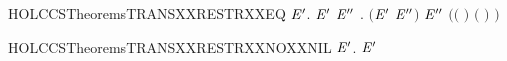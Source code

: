 \newcommand{\HOLCCSTheoremsTRANSXXRESTR}{\UseVerbatim{HOLCCSTheoremsTRANSXXRESTR}}
\begin{SaveVerbatim}{HOLCCSTheoremsTRANSXXRESTRXXEQ}
\HOLTokenTurnstile{} \HOLSymConst{\HOLTokenForall{}}   \ensuremath{\HOLBoundVar{E}\sp{\prime}}.
          \HOLTokenTransBegin{}\HOLTokenTransEnd \ensuremath{\HOLBoundVar{E}\sp{\prime}} \HOLSymConst{\HOLTokenEquiv{}}
       \HOLSymConst{\HOLTokenExists{}}\ensuremath{\HOLBoundVar{E}\sp{\prime\prime}} .
           \ensuremath{(}\ensuremath{\HOLBoundVar{E}\sp{\prime}} \HOLSymConst{\ensuremath{=}}   \ensuremath{\HOLBoundVar{E}\sp{\prime\prime}}\ensuremath{)} \HOLSymConst{\HOLTokenConj{}}  \HOLTokenTransBegin{}\HOLTokenTransEnd \ensuremath{\HOLBoundVar{E}\sp{\prime\prime}} \HOLSymConst{\HOLTokenConj{}}
           \ensuremath{(}\ensuremath{(} \HOLSymConst{\ensuremath{=}} \HOLConst{\ensuremath{\tau}}\ensuremath{)} \HOLSymConst{\HOLTokenDisj{}} \ensuremath{(} \HOLSymConst{\ensuremath{=}}  \ensuremath{)} \HOLSymConst{\HOLTokenConj{}}  \HOLConst{\HOLTokenNotIn{}}  \HOLSymConst{\HOLTokenConj{}}   \HOLConst{\HOLTokenNotIn{}} \ensuremath{)}
\end{SaveVerbatim}
\newcommand{\HOLCCSTheoremsTRANSXXRESTRXXEQ}{\UseVerbatim{HOLCCSTheoremsTRANSXXRESTRXXEQ}}
\begin{SaveVerbatim}{HOLCCSTheoremsTRANSXXRESTRXXNOXXNIL}
\HOLTokenTurnstile{} \HOLSymConst{\HOLTokenForall{}}   \ensuremath{\HOLBoundVar{E}\sp{\prime}}.    \HOLTokenTransBegin{}\HOLTokenTransEnd {}  \ensuremath{\HOLBoundVar{E}\sp{\prime}} \HOLSymConst{\HOLTokenImp{}}  \HOLSymConst{\HOLTokenNotEqual{}} 
\end{SaveVerbatim}
\newcommand{\HOLCCSTheoremsTRANSXXRESTRXXNOXXNIL}{\UseVerbatim{HOLCCSTheoremsTRANSXXRESTRXXNOXXNIL}}
